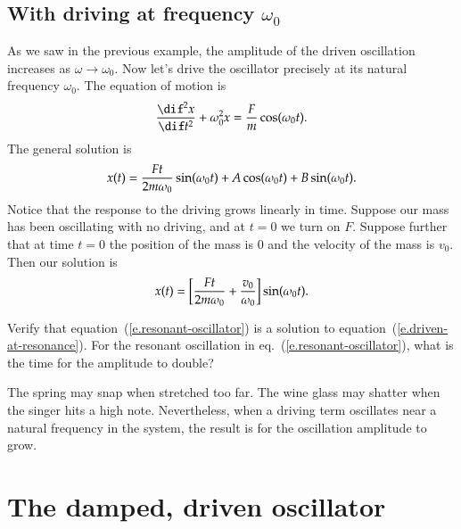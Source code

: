 \subsection{With driving at frequency $\omega_{0}$}

As we saw in the previous example, the amplitude of the driven oscillation increases as $\omega\to\omega_{0}$.  Now let's drive the oscillator precisely at its natural frequency $\omega_{0}$.  The equation of motion is
\begin{equation}\label{e.driven-at-resonance}
	\DDtt{x} + \omega_{0}^{2}x = \frac{F}{m}\cos(\omega_{0}t).
\end{equation}
The general solution is
\[
	x(t) = \frac{Ft}{2m\omega_{0}}\sin(\omega_{0} t) + A\cos(\omega_{0} t) + B\sin(\omega_{0} t).
\]
Notice that the response to the driving grows linearly in time. Suppose our mass has been oscillating with no driving, and at $t=0$ we turn on $F$.  Suppose further that at time $t=0$ the position of the mass is $0$ and the velocity of the mass is $v_{0}$.  Then our solution is
\begin{equation}\label{e.resonant-oscillator}
	x(t) = \left[\frac{Ft}{2m\omega_{0}} + \frac{v_{0}}{\omega_{0}}\right]\sin(\omega_{0} t).
\end{equation}

\begin{exercisebox}
Verify that equation~(\ref{e.resonant-oscillator}) is a solution to equation~(\ref{e.driven-at-resonance}).  For the resonant oscillation in eq.~(\ref{e.resonant-oscillator}), what is the time for the amplitude to double?
\end{exercisebox}

 The spring may snap when stretched too far. The wine glass may shatter when the singer hits a high note. Nevertheless, when a driving term oscillates near a natural frequency in the system, the result is for the oscillation amplitude to grow.
\section{The damped, driven oscillator}


